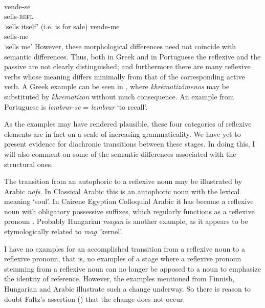 
\ea\label{ex:E20}
\langinfo{\LangPort}{}{}  \\
 \ea
 \gll vende-se  \\
 sells-\textsc{refl}  \\
\glt ‘sells itself’ (i.e. is for sale)
\ex 
\gll vende-me \\
sells-me \\
\glt ‘sells me’
\z
\z
\noindent However, these morphological differences need not coincide with semantic differences. Thus, both in Greek and in Portuguese the reflexive and the passive are not clearly distinguished; and furthermore there are many reflexive verbs whose meaning differs minimally from that of the corresponding active verb. A Greek example can be seen in , where \textit{khr\=ematizómenos} may be substituted by \textit{khr\=ematízon} without much consequence. An example from Portuguese is \textit{lembrar-se} = \textit{lembrar} ‘to recall’.

As the examples may have rendered plausible, these four categories of reflexive elements are in fact on a scale of increasing grammaticality. We have yet to present evidence for diachronic transitions between these stages. In doing this, I will also comment on some of the semantic differences associated with the structural ones.

The transition from an autophoric to a reflexive noun may be illustrated by Arabic \textit{nafs}. In Classical Arabic this is an autophoric noun with the lexical meaning ‘soul’. In Cairene Egyptian Colloquial Arabic it has become a reflexive noun with obligatory possessive suffixes, which regularly functions as a reflexive pronoun \citep[80f]{GaryEtAl1982}. Probably Hungarian \textit{magan} is another example, as it appears to be etymologically related to \textit{mag} ‘kernel’.

I have no examples for an accomplished transition from a reflexive noun to a reflexive pronoun, that is, no examples of a stage where a reflexive pronoun stemming from a reflexive noun can no longer be apposed to a noun to emphasize the identity of reference. However, the examples mentioned from Finnish, Hungarian and Arabic illustrate such a change underway. So there is reason to doubt Faltz's assertion (\citeyear[236--238]{Faltz1977}) that the change does not occur.

